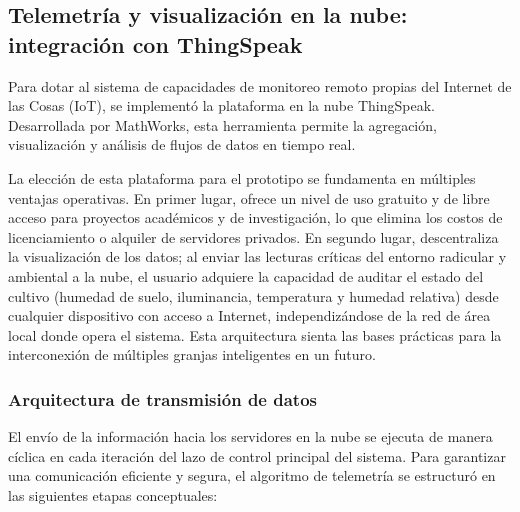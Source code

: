 \subsection{Telemetría y visualización en la nube: integración con ThingSpeak}
\label{subsec:thingspeak}

Para dotar al sistema de capacidades de monitoreo remoto propias del Internet de las Cosas (IoT), se implementó la plataforma en la nube ThingSpeak. Desarrollada por MathWorks, esta herramienta permite la agregación, visualización y análisis de flujos de datos en tiempo real.

La elección de esta plataforma para el prototipo se fundamenta en múltiples ventajas operativas. En primer lugar, ofrece un nivel de uso gratuito y de libre acceso para proyectos académicos y de investigación, lo que elimina los costos de licenciamiento o alquiler de servidores privados. En segundo lugar, descentraliza la visualización de los datos; al enviar las lecturas críticas del entorno radicular y ambiental a la nube, el usuario adquiere la capacidad de auditar el estado del cultivo (humedad de suelo, iluminancia, temperatura y humedad relativa) desde cualquier dispositivo con acceso a Internet, independizándose de la red de área local donde opera el sistema. Esta arquitectura sienta las bases prácticas para la interconexión de múltiples granjas inteligentes en un futuro.

\subsubsection{Arquitectura de transmisión de datos}

El envío de la información hacia los servidores en la nube se ejecuta de manera cíclica en cada iteración del lazo de control principal del sistema. Para garantizar una comunicación eficiente y segura, el algoritmo de telemetría se estructuró en las siguientes etapas conceptuales:

